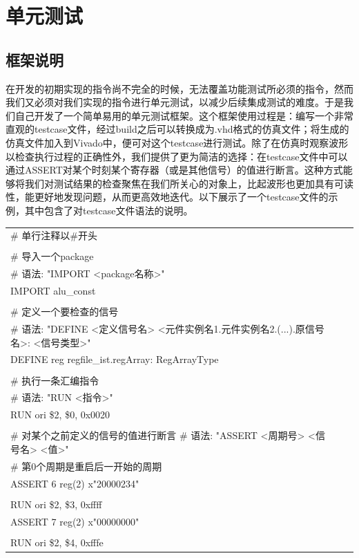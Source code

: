 \documentclass[11pt,utf8]{article}
\begin{document}
\section{单元测试} {

\subsection{框架说明} {
在开发的初期实现的指令尚不完全的时候，无法覆盖功能测试所必须的指令，然而我们又必须对我们实现的指令进行单元测试，以减少后续集成测试的难度。于是我们自己开发了一个简单易用的单元测试框架。这个框架使用过程是：编写一个非常直观的testcase文件，经过build之后可以转换成为.vhd格式的仿真文件；将生成的仿真文件加入到Vivado中，便可对这个testcase进行测试。除了在仿真时观察波形以检查执行过程的正确性外，我们提供了更为简洁的选择：在testcase文件中可以通过ASSERT对某个时刻某个寄存器（或是其他信号）的值进行断言。这种方式能够将我们对测试结果的检查聚焦在我们所关心的对象上，比起波形也更加具有可读性，能更好地发现问题，从而更高效地迭代。以下展示了一个testcase文件的示例，其中包含了对testcase文件语法的说明。
\begin{table}[!htb]
	\begin{center}
		\begin{tabular*}{15cm}{lll}  
			\hline  
\# 单行注释以\#开头\\
\\
\# 导入一个package\\
\# 语法: "IMPORT <package名称>"\\
IMPORT alu\_const\\
\\
\# 定义一个要检查的信号\\
\# 语法: "DEFINE <定义信号名> <元件实例名1.元件实例名2.(...).原信号名>: <信号类型>"\\
DEFINE reg regfile\_ist.regArray: RegArrayType\\
\\
\# 执行一条汇编指令\\
\# 语法: "RUN <指令>"\\
RUN ori \$2, \$0, 0x0020\\
\\
\# 对某个之前定义的信号的值进行断言
\# 语法: "ASSERT <周期号> <信号名> <值>"\\
\# 第0个周期是重启后一开始的周期\\
ASSERT 6 reg(2) x"20000234"\\
\\
RUN ori \$2, \$3, 0xffff\\
ASSERT 7 reg(2) x"00000000"\\
\\
RUN ori \$2, \$4, 0xfffe\\
			\hline  
		\end{tabular*}  
	\end{center}
\end{table}

}}
\end{document}
